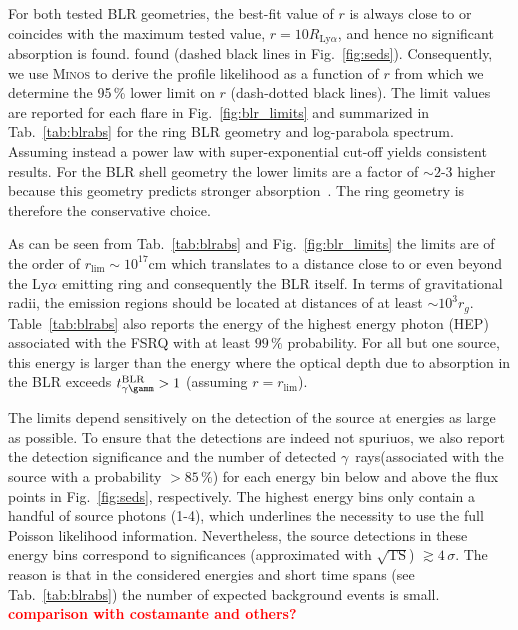 \documentclass[twocolumn]{aastex62}
\newcommand{\Grays}{$\gamma$~rays\xspace}
\newcommand{\todo}[1]{\textbf{\textcolor{red}{#1}}}
\begin{document}
For both tested BLR geometries, the best-fit value of $r$ is always close to or coincides with the maximum tested value, $r = 10R_{\mathrm{Ly}\alpha}$, and hence no significant absorption is found. found (dashed black lines in Fig.~\ref{fig:seds}). Consequently,  we use \textsc{Minos} to derive the profile likelihood as a function of $r$ from which we determine the 95\,\% lower limit on $r$ (dash-dotted black lines). 
The limit values are reported for each flare in Fig.~\ref{fig:blr_limits} and  summarized in Tab.~\ref{tab:blrabs} for the ring BLR geometry and log-parabola spectrum.
Assuming instead a power law with super-exponential cut-off yields consistent results. 
For the BLR shell geometry the lower limits are a factor of $\sim2$-$3$ higher because this geometry predicts stronger absorption~\citep{finke2016}. The ring geometry is therefore the conservative choice. 

As can be seen from Tab.~\ref{tab:blrabs} and Fig.~\ref{fig:blr_limits} the limits are of the order of $r_\mathrm{lim}\sim10^{17}$cm which translates to a distance close to or even beyond the Ly$\alpha$ emitting ring and consequently the BLR itself. In terms of gravitational radii, the emission regions should be located at distances of at least $\sim10^3r_g$. 
Table~\ref{tab:blrabs} also reports the energy of the highest energy photon (HEP) associated with the FSRQ with at least $99\,\%$ probability. For all but one source, this energy is larger than the energy where the optical depth due to absorption in the BLR exceeds $t_{\gamma\gamm}^\mathrm{BLR} > 1$ (assuming $r = r_\mathrm{lim}$). 

The limits depend sensitively on the detection of the source at energies as large as possible. To ensure that the detections are indeed not spuriuos, we also report the detection significance and the number of detected \Grays (associated with the source with a probability $>85\,\%$) for each energy bin below and above the flux points in Fig.~\ref{fig:seds}, respectively. The highest energy bins only contain a handful of source photons (1-4), which underlines the necessity to use the full Poisson likelihood information. 
Nevertheless, the source detections in these energy bins correspond to significances (approximated with  $\sqrt{\mathrm{TS}}$) $\gtrsim 4\,\sigma$.
The reason is that in the considered energies and short time spans (see Tab.~\ref{tab:blrabs}) the number of expected background events is small. 
\todo{comparison with costamante and others?}
\end{document}
